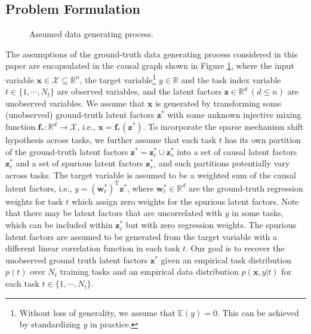 \documentclass[10pt]{article} %
\theoremstyle{plain}
\theoremstyle{definition}
\begin{document}
\subsection{Problem Formulation}
\begin{figure}
    \centering
    \caption{Assumed data generating process.}
    \label{fig:causal-graph}
\end{figure}
The assumptions of the ground-truth data generating process considered in this paper are encapsulated in the causal graph shown in Figure \ref{fig:causal-graph}, where the input variable $\mathbf{x}\in\mathcal{X}\subseteq\mathbb{R}^n$, the target variable\footnote{Without loss of generality, we assume that $\mathbb{E}(y)=0$. This can be achieved by standardizing $y$ in practice.} $y\in\mathbb{R}$ and the task index variable $t\in\{1,\cdots,N_t\}$ are observed variables, and the latent factors $\mathbf{z}\in\mathbb{R}^d~(d\leq n)$ are unobserved variables. We assume that $\mathbf{x}$ is generated by transforming some (unobserved) ground-truth latent factors $\mathbf{z}^*$ with some unknown injective mixing function $\mathbf{f}_*:\mathbb{R}^d\to\mathcal{X}$, i.e., $\mathbf{x}=\mathbf{f}_*(\mathbf{z^*})$. 
To incorporate the sparse mechanism shift hypothesis across tasks, we further assume that each task $t$ has its own partition of the ground-truth latent factors $\mathbf{z}^*=\mathbf{z}_c^*\cup\mathbf{z}_s^*$ into a set of causal latent factors $\mathbf{z}_c^*$ and a set of spurious latent factors $\mathbf{z}_s^*$, and such partitions potentially vary across tasks. The target variable is assumed to be a weighted sum of the causal latent factors, i.e., $y=(\mathbf{w}_t^*)^{\text{T}}\mathbf{z}^*$, where $\mathbf{w}_t^*\in\mathbb{R}^d$ are the ground-truth regression weights for task $t$ which assign zero weights for the spurious latent factors. Note that there may be latent factors that are uncorrelated with $y$ in some
tasks, which can be included within $\mathbf{z}_c^*$ but with zero regression weights. The spurious latent factors are assumed to be generated from the target variable with a different linear correlation function in each task $t$. Our goal is to recover the unobserved ground truth latent factors $\mathbf{z}^*$ given an empirical task distribution $p(t)$ over $N_t$ training tasks and an empirical data distribution $p(\mathbf{x},y|t)$ for each task $t\in\{1,\cdots,N_t\}$. 
\end{document}
